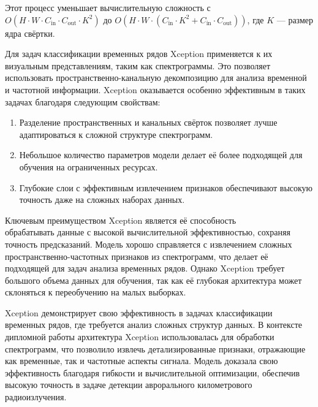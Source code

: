 \documentclass[spec, och, diploma]{SCWorks}
\begin{document}
            Этот процесс уменьшает вычислительную сложность с \\ \(O(H \cdot W
            \cdot C_{\text{in}} \cdot C_{\text{out}} \cdot K^2)\) до \(O(H \cdot
            W \cdot (C_{\text{in}} \cdot K^2 + C_{\text{in}} \cdot
            C_{\text{out}}))\), где \(K\) — размер ядра свёртки.
        
        
            Для задач классификации временных рядов Xception применяется к их
            визуальным представлениям, таким как спектрограммы. Это позволяет
            использовать пространственно-канальную декомпозицию для анализа
            временной и частотной информации. Xception оказывается особенно
            эффективным в таких задачах благодаря следующим свойствам:
            
            \begin{enumerate}
                \item Разделение пространственных и канальных свёрток позволяет
                лучше адаптироваться к сложной структуре спектрограмм.
                \item Небольшое количество параметров модели делает её более
                подходящей для обучения на ограниченных ресурсах.
                \item Глубокие слои с эффективным извлечением признаков
                обеспечивают высокую точность даже на сложных наборах данных.
            \end{enumerate}
            
            Ключевым преимуществом Xception является её способность\\
            обрабатывать данные с высокой вычислительной эффективностью,
            сохраняя точность предсказаний. Модель хорошо справляется с
            извлечением сложных пространственно-частотных признаков из
            спектрограмм, что делает её подходящей для задач анализа временных
            рядов. Однако Xception требует большого объема данных для обучения,
            так как её глубокая архитектура может склоняться к переобучению на
            малых выборках. 
            
            Xception демонстрирует свою эффективность в задачах классификации
            временных рядов, где требуется анализ сложных структур данных. В
            контексте дипломной работы архитектура Xception использовалась для
            обработки спектрограмм, что позволило извлечь детализированные
            признаки, отражающие как временные, так и частотные аспекты сигнала.
            Модель доказала свою эффективность благодаря гибкости и
            вычислительной оптимизации, обеспечив высокую точность в задаче
            детекции аврорального километрового радиоизлучения.
\end{document}
